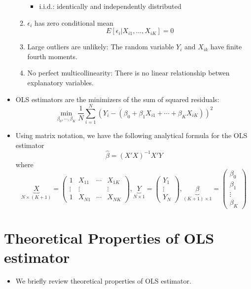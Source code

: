 \documentclass[]{book}
\providecommand{\tightlist}{%
  \setlength{\itemsep}{0pt}\setlength{\parskip}{0pt}}
\begin{document}
\begin{itemize}
\begin{enumerate}
    \begin{itemize}
    \tightlist
    \item
      i.i.d.: identically and independently distributed
    \end{itemize}
  \item
    \(\epsilon_i\) has zero conditional mean
    \[
        E[ \epsilon_i | X_{i1}, \ldots, X_{iK}] = 0
        \]
  \item
    Large outliers are unlikely: The random variable \(Y_i\) and \(X_{ik}\) have finite fourth moments.
  \item
    No perfect multicollinearity: There is no linear relationship betwen explanatory variables.
  \end{enumerate}
\item
  OLS estimators are the minimizers of the sum of squared residuals:
  \[
   \min_{\beta_0, \cdots, \beta_K} \frac{1}{N} \sum_{i=1}^N (Y_i - (\beta_0 + \beta_1 X_{i1} + \cdots + \beta_K X_{iK}))^2
   \]
\item
  Using matrix notation, we have the following analytical formula for the OLS estimator
  \[
    \hat{\beta} = (X'X)^{-1} X'Y
    \]
  where
  \[
  \underbrace{X}_{N\times (K+1)}=\left(\begin{array}{cccc}
  1 & X_{11} & \cdots & X_{1K}\\
  \vdots & \vdots &  & \vdots\\
  1 & X_{N1} & \cdots & X_{NK}
  \end{array}\right),\underbrace{Y}_{N\times 1}=\left(\begin{array}{c}
  Y_{1}\\
  \vdots\\
  Y_{N}
  \end{array}\right),\underbrace{\beta}_{(K+1)\times 1}=\left(\begin{array}{c}
  \beta_{0}\\
  \beta_{1}\\
  \vdots\\
  \beta_{K}
  \end{array}\right)            
  \]
\end{itemize}

\hypertarget{theoretical-properties-of-ols-estimator}{%
\section{Theoretical Properties of OLS estimator}\label{theoretical-properties-of-ols-estimator}}

\begin{itemize}
\tightlist
\item
  We briefly review theoretical properties of OLS estimator.
\end{itemize}
\end{document}
